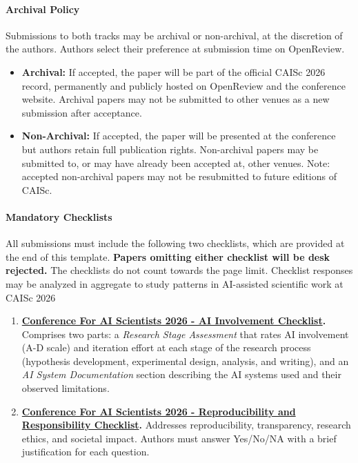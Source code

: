 \documentclass{article}
\begin{document}
\paragraph{Archival Policy}
Submissions to both tracks may be archival or non-archival, at the discretion of the authors. Authors select their preference at submission time on OpenReview.
\begin{itemize}
    \item\textbf{Archival:} If accepted, the paper will be part of the official CAISc 2026 record, permanently and publicly hosted on OpenReview and the conference website. Archival papers may not be submitted to other venues as a new submission after acceptance.
    \item\textbf{Non-Archival:} If accepted, the paper will be presented at the conference but authors retain full publication rights. Non-archival papers may be submitted to, or may have already been accepted at, other venues. Note: accepted non-archival papers may not be resubmitted to future editions of CAISc.
\end{itemize}

\paragraph{Mandatory Checklists}
All submissions must include the following two checklists, which are provided at the end of this template. {\bf Papers omitting either checklist will be desk rejected.} The checklists do not count towards the page limit. Checklist responses may be analyzed in aggregate to study patterns in AI-assisted scientific work at CAISc 2026

\begin{enumerate}
  \item {\bf \hyperref[checklist_ai_involvement]{Conference For AI Scientists 2026 - AI Involvement Checklist}.} Comprises two parts: a \emph{Research Stage Assessment} that rates AI involvement (A-D scale) and iteration effort at each stage of the research process (hypothesis development, experimental design, analysis, and writing), and an \emph{AI System Documentation} section describing the AI systems used and their observed limitations.

  \item {\bf \hyperref[checklist_reproducibility]{Conference For AI Scientists 2026 - Reproducibility and Responsibility Checklist}.} Addresses reproducibility, transparency, research ethics, and societal impact. Authors must answer Yes/No/NA with a brief justification for each question.
\end{enumerate}
\end{document}
